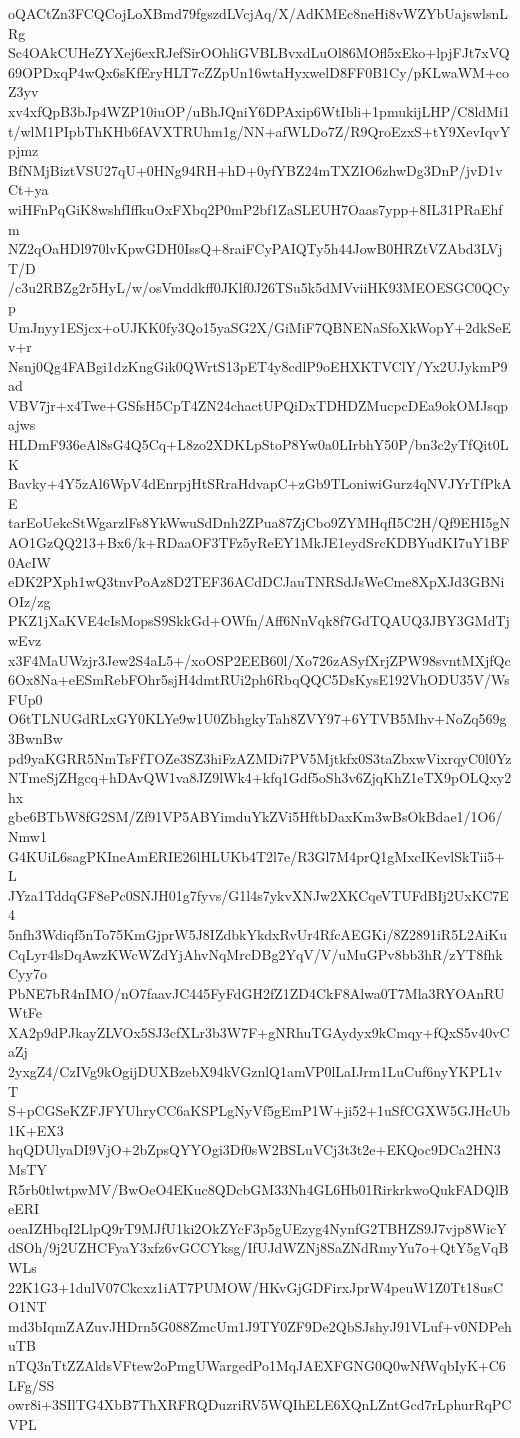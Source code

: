 oQACtZn3FCQCojLoXBmd79fgszdLVcjAq/X/AdKMEc8neHi8vWZYbUajswlsnLRg
Sc4OAkCUHeZYXej6exRJefSirOOhliGVBLBvxdLuOl86MOfl5xEko+lpjFJt7xVQ
69OPDxqP4wQx6sKfEryHLT7cZZpUn16wtaHyxwelD8FF0B1Cy/pKLwaWM+coZ3yv
xv4xfQpB3bJp4WZP10iuOP/uBhJQniY6DPAxip6WtIbli+1pmukijLHP/C8ldMi1
t/wlM1PIpbThKHb6fAVXTRUhm1g/NN+afWLDo7Z/R9QroEzxS+tY9XevIqvYpjmz
BfNMjBiztVSU27qU+0HNg94RH+hD+0yfYBZ24mTXZIO6zhwDg3DnP/jvD1vCt+ya
wiHFnPqGiK8wshfIffkuOxFXbq2P0mP2bf1ZaSLEUH7Oaas7ypp+8IL31PRaEhfm
NZ2qOaHDl970lvKpwGDH0IssQ+8raiFCyPAIQTy5h44JowB0HRZtVZAbd3LVjT/D
/c3u2RBZg2r5HyL/w/osVmddkff0JKlf0J26TSu5k5dMVviiHK93MEOESGC0QCyp
UmJnyy1ESjcx+oUJKK0fy3Qo15yaSG2X/GiMiF7QBNENaSfoXkWopY+2dkSeEv+r
Nsnj0Qg4FABgi1dzKngGik0QWrtS13pET4y8cdlP9oEHXKTVClY/Yx2UJykmP9ad
VBV7jr+x4Twe+GSfsH5CpT4ZN24chactUPQiDxTDHDZMucpcDEa9okOMJsqpajws
HLDmF936eAl8sG4Q5Cq+L8zo2XDKLpStoP8Yw0a0LIrbhY50P/bn3c2yTfQit0LK
Bavky+4Y5zAl6WpV4dEnrpjHtSRraHdvapC+zGb9TLoniwiGurz4qNVJYrTfPkAE
tarEoUekcStWgarzlFs8YkWwuSdDnh2ZPua87ZjCbo9ZYMHqfI5C2H/Qf9EHI5gN
AO1GzQQ213+Bx6/k+RDaaOF3TFz5yReEY1MkJE1eydSrcKDBYudKI7uY1BF0AcIW
eDK2PXph1wQ3tnvPoAz8D2TEF36ACdDCJauTNRSdJsWeCme8XpXJd3GBNiOIz/zg
PKZ1jXaKVE4cIsMopsS9SkkGd+OWfn/Aff6NnVqk8f7GdTQAUQ3JBY3GMdTjwEvz
x3F4MaUWzjr3Jew2S4aL5+/xoOSP2EEB60l/Xo726zASyfXrjZPW98svntMXjfQc
6Ox8Na+eESmRebFOhr5sjH4dmtRUi2ph6RbqQQC5DsKysE192VhODU35V/WsFUp0
O6tTLNUGdRLxGY0KLYe9w1U0ZbhgkyTah8ZVY97+6YTVB5Mhv+NoZq569g3BwnBw
pd9yaKGRR5NmTsFfTOZe3SZ3hiFzAZMDi7PV5Mjtkfx0S3taZbxwVixrqyC0l0Yz
NTmeSjZHgcq+hDAvQW1va8JZ9lWk4+kfq1Gdf5oSh3v6ZjqKhZ1eTX9pOLQxy2hx
gbe6BTbW8fG2SM/Zf91VP5ABYimduYkZVi5HftbDaxKm3wBsOkBdae1/1O6/Nmw1
G4KUiL6sagPKIneAmERIE26lHLUKb4T2l7e/R3Gl7M4prQ1gMxcIKevlSkTii5+L
JYza1TddqGF8ePc0SNJH01g7fyvs/G1l4s7ykvXNJw2XKCqeVTUFdBIj2UxKC7E4
5nfh3Wdiqf5nTo75KmGjprW5J8IZdbkYkdxRvUr4RfcAEGKi/8Z2891iR5L2AiKu
CqLyr4lsDqAwzKWcWZdYjAhvNqMrcDBg2YqV/V/uMuGPv8bb3hR/zYT8fhkCyy7o
PbNE7bR4nIMO/nO7faavJC445FyFdGH2fZ1ZD4CkF8Alwa0T7Mla3RYOAnRUWtFe
XA2p9dPJkayZLVOx5SJ3cfXLr3b3W7F+gNRhuTGAydyx9kCmqy+fQxS5v40vCaZj
2yxgZ4/CzIVg9kOgijDUXBzebX94kVGznlQ1amVP0lLaIJrm1LuCuf6nyYKPL1vT
S+pCGSeKZFJFYUhryCC6aKSPLgNyVf5gEmP1W+ji52+1uSfCGXW5GJHcUb1K+EX3
hqQDUlyaDI9VjO+2bZpsQYYOgi3Df0sW2BSLuVCj3t3t2e+EKQoc9DCa2HN3MsTY
R5rb0tlwtpwMV/BwOeO4EKuc8QDcbGM33Nh4GL6Hb01RirkrkwoQukFADQlBeERI
oeaIZHbqI2LlpQ9rT9MJfU1ki2OkZYcF3p5gUEzyg4NynfG2TBHZS9J7vjp8WicY
dSOh/9j2UZHCFyaY3xfz6vGCCYksg/IfUJdWZNj8SaZNdRmyYu7o+QtY5gVqBWLs
22K1G3+1dulV07Ckcxz1iAT7PUMOW/HKvGjGDFirxJprW4peuW1Z0Tt18usCO1NT
md3bIqmZAZuvJHDrn5G088ZmcUm1J9TY0ZF9De2QbSJshyJ91VLuf+v0NDPehuTB
nTQ3nTtZZAldsVFtew2oPmgUWargedPo1MqJAEXFGNG0Q0wNfWqbIyK+C6LFg/SS
owr8i+3SIlTG4XbB7ThXRFRQDuzriRV5WQIhELE6XQnLZntGcd7rLphurRqPCVPL
